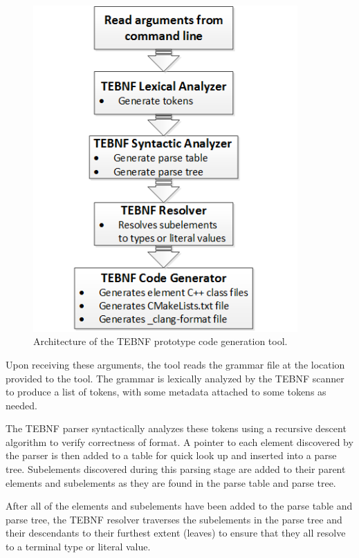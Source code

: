 \begin{figure}[htbp]
\centering
\includegraphics[width=0.9\textwidth]{figures/TEBNFCodeGenToolArchitecture.png}
\caption{Architecture of the TEBNF prototype code generation tool.}
\label{fig:TEBNFCodeGenToolArchitecture}
\end{figure}

\indent
Upon receiving these arguments, the tool reads the grammar file at the location provided to the tool.  The grammar is lexically analyzed by the TEBNF scanner to produce a list of tokens, with some metadata attached to some tokens as needed.

\indent
The TEBNF parser syntactically analyzes these tokens using a recursive descent algorithm to verify correctness of format.  A pointer to each element discovered by the parser is then added to a table for quick look up and inserted into a parse tree.  Subelements discovered during this parsing stage are added to their parent elements and subelements as they are found in the parse table and parse tree.

\indent
After all of the elements and subelements have been added to the parse table and parse tree, the TEBNF resolver traverses the subelements in the parse tree and their descendants to their furthest extent (leaves) to ensure that they all resolve to a terminal type or literal value.

